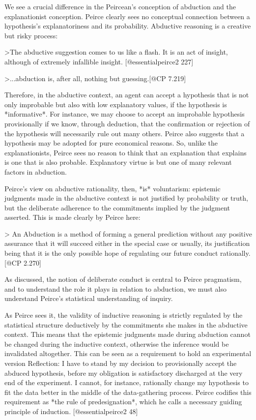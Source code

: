 We see a crucial difference in the Peircean's conception of abduction
and the explanationist conception. Peirce clearly sees no conceptual
connection between a hypothesis's explanatoriness and its probability.
Abductive reasoning is a creative but risky process:

\textgreater{}The abductive suggestion comes to us like a flash. It is
an act of insight, although of extremely infallible insight.
{[}@essentialpeirce2 227{]}

\textgreater{}...abduction is, after all, nothing but guessing.{[}@CP
7.219{]}

Therefore, in the abductive context, an agent can accept a hypothesis
that is not only improbable but also with low explanatory values, if the
hypothesis is *informative*. For instance, we may choose to accept an
improbable hypothesis provisionally if we know, through deduction, that
the confirmation or rejection of the hypothesis will necessarily rule
out many others. Peirce also suggests that a hypothesis may be adopted
for pure economical reasons. So, unlike the explanationists, Peirce sees
no reason to think that an explanation that explains is one that is also
probable. Explanatory virtue is but one of many relevant factors in
abduction.

Peirce's view on abductive rationality, then, *is* voluntarism:
epistemic judgments made in the abductive context is not justified by
probability or truth, but the deliberate adherence to the commitments
implied by the judgment asserted. This is made clearly by Peirce here:

\textgreater{} An Abduction is a method of forming a general prediction
without any positive assurance that it will succeed either in the
special case or usually, its justification being that it is the only
possible hope of regulating our future conduct rationally.{[}@CP
2.270{]}

As discussed, the notion of deliberate conduct is central to Peirce
pragmatism, and to understand the role it plays in relation to
abduction, we must also understand Peirce's statistical understanding of
inquiry.

As Peirce sees it, the validity of inductive reasoning is strictly
regulated by the statistical structure deductively by the commitments
she makes in the abductive context. This means that the epistemic
judgments made during abduction cannot be changed during the inductive
context, otherwise the inference would be invalidated altogether. This
can be seen as a requirement to hold an experimental version Reflection:
I have to stand by my decision to provisionally accept the abduced
hypothesis, before my obligation is satisfactory discharged at the very
end of the experiment. I cannot, for instance, rationally change my
hypothesis to fit the data better in the middle of the data-gathering
process. Peirce codifies this requirement as *the rule of
predesignation*, which he calls a necessary guiding principle of
induction. {[}@essentialpeirce2 48{]}

